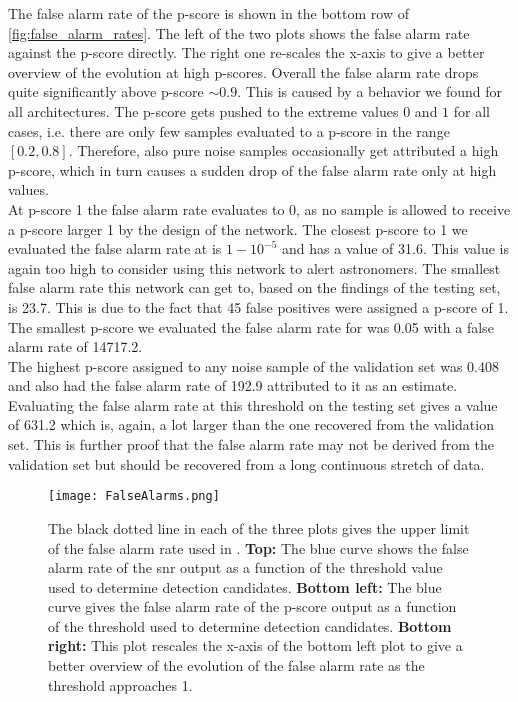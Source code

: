 The false alarm rate of the p-score is shown in the bottom row of \autoref{fig:false_alarm_rates}. The left of the two plots shows the false alarm rate against the p-score directly. The right one re-scales the x-axis to give a better overview of the evolution at high p-scores. Overall the false alarm rate drops quite significantly above p-score $\sim 0.9$. This is caused by a behavior we found for all architectures. The p-score gets pushed to the extreme values $0$ and $1$ for all cases, i.e. there are only few samples evaluated to a p-score in the range $\left[0.2,0.8\right]$. Therefore, also pure noise samples occasionally get attributed a high p-score, which in turn causes a sudden drop of the false alarm rate only at high values.\\
At p-score 1 the false alarm rate evaluates to 0, as no sample is allowed to receive a p-score larger 1 by the design of the network. The closest p-score to 1 we evaluated the false alarm rate at is $1-10^{-5}$ and has a value of 31.6. This value is again too high to consider using this network to alert astronomers. The smallest false alarm rate this network can get to, based on the findings of the testing set, is 23.7. This is due to the fact that 45 false positives were assigned a p-score of 1. The smallest p-score we evaluated the false alarm rate for was 0.05 with a false alarm rate of 14717.2.\\
The highest p-score assigned to any noise sample of the validation set was 0.408 and also had the false alarm rate of 192.9 attributed to it as an estimate. Evaluating the false alarm rate at this threshold on the testing set gives a value of 631.2 which is, again, a lot larger than the one recovered from the validation set. This is further proof that the false alarm rate may not be derived from the validation set but should be recovered from a long continuous stretch of data.
\begin{figure}
\centering
\texttt{[image: FalseAlarms.png]}
\caption[False alarm rates of single outputs]{The black dotted line in each of the three plots gives the upper limit of the false alarm rate used in \cite{bns_network}. \textbf{Top:} The blue curve shows the false alarm rate of the \gls{snr} output as a function of the threshold value used to determine detection candidates. \textbf{Bottom left:} The blue curve gives the false alarm rate of the p-score output as a function of the threshold used to determine detection candidates. \textbf{Bottom right:} This plot rescales the x-axis of the bottom left plot to give a better overview of the evolution of the false alarm rate as the threshold approaches 1.}\label{fig:false_alarm_rates}
\end{figure}\medskip\\
